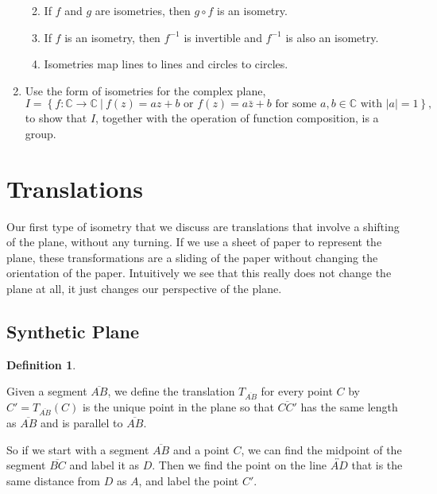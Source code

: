 \documentclass[
]{book}
\providecommand{\tightlist}{%
  \setlength{\itemsep}{0pt}\setlength{\parskip}{0pt}}
\theoremstyle{definition}
\newtheorem{definition}{Definition}[chapter]
\theoremstyle{definition}
\theoremstyle{definition}
\theoremstyle{definition}
\theoremstyle{remark}
\begin{document}
\begin{enumerate}
  \begin{enumerate}
  \def\labelenumii{\alph{enumii}.}
  \tightlist
  \item
    If \(f\) and \(g\) are isometries, then \(g\circ f\) is an isometry.
  \item
    If \(f\) is an isometry, then \(f^{-1}\) is invertible and \(f^{-1}\) is also an isometry.
  \item
    Isometries map lines to lines and circles to circles.
  \end{enumerate}
\item
  Use the form of isometries for the complex plane, \[I = \left\{ f: \mathbb{C} \rightarrow \mathbb{C} \:\vert \: f(z)=a z+b \mbox{ or } f(z)=a \bar{z}+b \mbox{ for some } a, b \in \mathbb{C} \mbox{ with } |a|=1 \right\},\] to show that \(I\), together with the operation of function composition, is a group.
\end{enumerate}

\hypertarget{translations}{%
\section{Translations}\label{translations}}

Our first type of isometry that we discuss are translations that involve a shifting of the plane, without any turning. If we use a sheet of paper to represent the plane, these transformations are a sliding of the paper without changing the orientation of the paper. Intuitively we see that this really does not change the plane at all, it just changes our perspective of the plane.

\hypertarget{synthetic-plane-1}{%
\subsection{Synthetic Plane}\label{synthetic-plane-1}}

\begin{definition}
\protect\hypertarget{def:unlabeled-div-257}{}\label{def:unlabeled-div-257}

Given a segment \(\overline{AB}\), we define the translation \(T_{\overline{AB}}\) for every point \(C\) by \(C'=T_{\overline{AB}}(C)\) is the unique point in the plane so that \(\overline{CC'}\) has the same length as \(\overline{AB}\) and is parallel to \(\overline{AB}\).

\end{definition}

So if we start with a segment \(\overline{AB}\) and a point \(C\), we can find the midpoint of the segment \(\overline{BC}\) and label it as \(D\). Then we find the point on the line \(\overleftrightarrow{AD}\) that is the same distance from \(D\) as \(A\), and label the point \(C'\).
\end{document}
